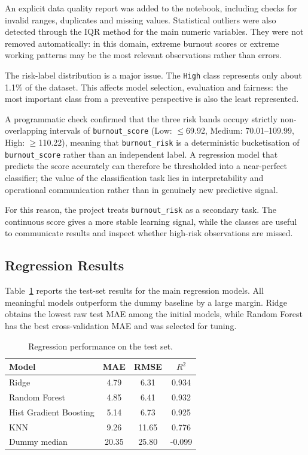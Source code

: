 \documentclass[conference]{IEEEtran}
\begin{document}
An explicit data quality report was added to the notebook, including checks for
invalid ranges, duplicates and missing values. Statistical outliers were also
detected through the IQR method for the main numeric variables. They were not
removed automatically: in this domain, extreme burnout scores or extreme working
patterns may be the most relevant observations rather than errors.

The risk-label distribution is a major issue. The \texttt{High} class represents
only about 1.1\% of the dataset. This affects model selection, evaluation and
fairness: the most important class from a preventive perspective is also the
least represented.

A programmatic check confirmed that the three risk bands occupy strictly
non-overlapping intervals of \texttt{burnout\_score} (Low: ${\leq}$69.92,
Medium: 70.01--109.99, High: ${\geq}$110.22), meaning that
\texttt{burnout\_risk} is a deterministic bucketisation of
\texttt{burnout\_score} rather than an independent label. A regression model
that predicts the score accurately can therefore be thresholded into a
near-perfect classifier; the value of the classification task lies in
interpretability and operational communication rather than in genuinely new
predictive signal.

For this reason, the project treats \texttt{burnout\_risk} as a secondary task.
The continuous score gives a more stable learning signal, while the classes are
useful to communicate results and inspect whether high-risk observations are
missed.

\subsection{Regression Results}

Table~\ref{tab:regression} reports the test-set results for the main regression
models. All meaningful models outperform the dummy baseline by a large margin.
Ridge obtains the lowest raw test MAE among the initial models, while Random
Forest has the best cross-validation MAE and was selected for tuning.

\begin{table}[h]
\centering
\caption{Regression performance on the test set.}
\label{tab:regression}
\begin{tabular}{lccc}
\toprule
Model & MAE & RMSE & $R^2$ \\
\midrule
Ridge & 4.79 & 6.31 & 0.934 \\
Random Forest & 4.85 & 6.41 & 0.932 \\
Hist Gradient Boosting & 5.14 & 6.73 & 0.925 \\
KNN & 9.26 & 11.65 & 0.776 \\
Dummy median & 20.35 & 25.80 & -0.099 \\
\bottomrule
\end{tabular}
\end{table}
\end{document}

